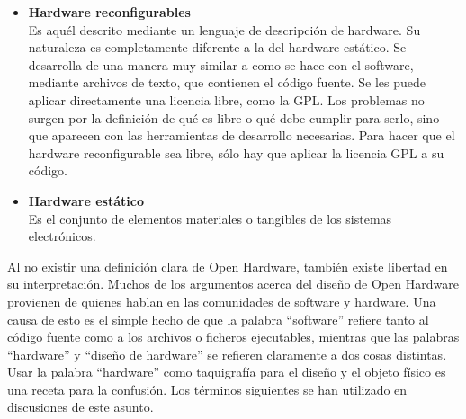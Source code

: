 \begin{itemize}
\item \textbf{Hardware reconfigurables}\\
Es aquél descrito mediante un lenguaje de descripción de hardware. Su naturaleza es completamente diferente a la del hardware estático. Se desarrolla de una manera muy similar a como se hace con el software, mediante archivos de texto, que contienen el código fuente. Se les puede aplicar directamente una licencia libre, como la GPL. Los problemas no surgen por la definición de qué es libre o qué debe cumplir para serlo, sino que aparecen con las herramientas de desarrollo necesarias. Para hacer que el hardware reconfigurable sea libre, sólo hay que aplicar la licencia GPL a su código.\\
\item \textbf{Hardware estático}\\
Es el conjunto de elementos materiales o tangibles de los sistemas electrónicos.
\end{itemize}


Al no existir una definición clara de Open Hardware, también existe libertad en su interpretación. Muchos de los argumentos acerca del diseño de Open Hardware provienen de quienes hablan en las comunidades de software y hardware. Una causa de esto es el simple hecho de que la palabra ``software'' refiere tanto al código fuente como a los archivos o ficheros ejecutables, mientras que las palabras ``hardware'' y ``diseño de hardware'' se refieren claramente a dos cosas distintas. Usar la palabra ``hardware'' como taquigrafía para el diseño y el objeto físico es una receta para la confusión. Los términos siguientes se han utilizado en discusiones de este asunto.

